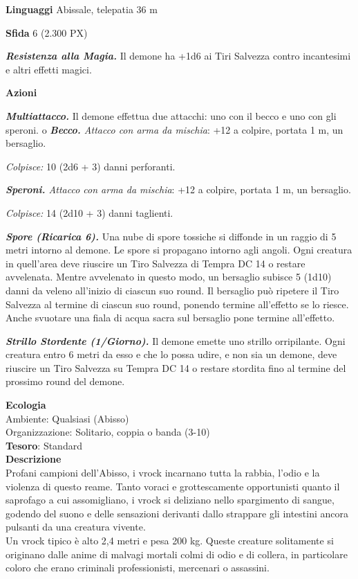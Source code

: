 \begin{multicols}{2}
\textbf{Linguaggi} Abissale, telepatia 36 m

\textbf{Sfida} 6 (2.300 PX)

\textit{\textbf{Resistenza alla Magia.}} Il demone ha +1d6 ai Tiri Salvezza contro incantesimi e altri effetti magici.

\textbf{Azioni}

\textit{\textbf{Multiattacco.}} Il demone effettua due attacchi: uno con il becco e uno con gli speroni.
o
\textit{\textbf{Becco.} Attacco con arma da mischia}: +12 a colpire, portata 1 m, un bersaglio.

\textit{Colpisce:} 10 (2d6 + 3) danni perforanti.

\textit{\textbf{Speroni.} Attacco con arma da mischia}: +12 a colpire, portata 1 m, un bersaglio.

\textit{Colpisce:} 14 (2d10 + 3) danni taglienti.

\textit{\textbf{Spore (Ricarica 6).}} Una nube di spore tossiche si diffonde in un raggio di 5 metri intorno al demone. Le spore si propagano intorno agli angoli. Ogni creatura in quell'area deve riuscire un Tiro Salvezza di Tempra DC 14 o restare avvelenata. Mentre  avvelenato in questo modo, un bersaglio subisce 5 (1d10) danni da  veleno all'inizio di ciascun suo round. Il bersaglio può ripetere il  Tiro Salvezza al termine di ciascun suo round, ponendo termine  all'effetto se lo riesce. Anche svuotare una fiala di acqua sacra sul  bersaglio pone termine all'effetto.

\textit{\textbf{Strillo Stordente (1/Giorno).}} Il demone emette uno strillo orripilante. Ogni creatura entro 6 metri da esso e che lo possa udire, e non sia un demone, deve riuscire un Tiro Salvezza su Tempra DC 14 o restare stordita fino al termine del prossimo round del demone.

\textbf{Ecologia}\\
Ambiente: Qualsiasi (Abisso)\\
Organizzazione: Solitario, coppia o banda (3-10)\\
\textbf{Tesoro}: Standard\\
\textbf{Descrizione}\\
Profani campioni dell'Abisso, i vrock incarnano tutta la rabbia, l'odio e la violenza di questo reame. Tanto voraci e grottescamente opportunisti quanto il saprofago a cui assomigliano, i vrock si deliziano nello spargimento di sangue, godendo del suono e delle sensazioni derivanti dallo strappare gli intestini ancora pulsanti da una creatura vivente.\\
Un vrock tipico è alto 2,4 metri e pesa 200 kg. Queste creature solitamente si originano dalle anime di malvagi mortali colmi di odio e di collera, in particolare coloro che erano criminali professionisti, mercenari o assassini.




\end{multicols}
